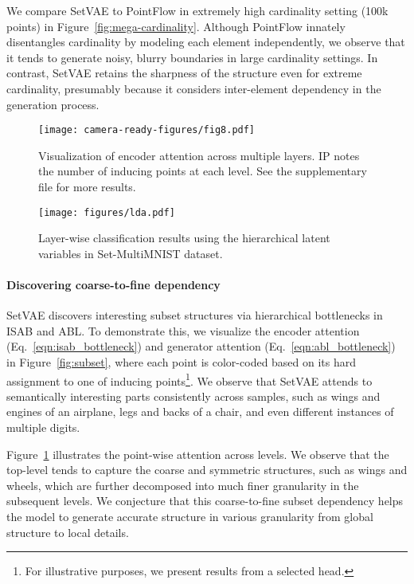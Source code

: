 \documentclass[final]{arxiv/cvpr}
\newcommand{\cutparagraphup}{\vspace*{-0.1in}}
\begin{document}
We compare SetVAE to PointFlow in extremely high cardinality setting (100k points) in Figure~\ref{fig:mega-cardinality}.
Although PointFlow innately disentangles cardinality by modeling each element independently, we observe that it tends to generate noisy, blurry boundaries in large cardinality settings.
In contrast, SetVAE retains the sharpness of the structure even for extreme cardinality, presumably because it considers inter-element dependency in the generation process.

\begin{figure}[!t]
    \centering
    \texttt{[image: camera-ready-figures/fig8.pdf]}
    \vspace{-0.35cm}
    \caption{Visualization of encoder attention across multiple layers.
    IP notes the number of inducing points at each level.
    See the supplementary file for more results.
    }
    \label{fig:composition}
    \vspace{-0.35cm}
\end{figure}
\begin{figure}[!t]
\centering
    \texttt{[image: figures/lda.pdf]}
    \vspace{-0.3cm}
    \caption{
    Layer-wise classification results using the hierarchical latent variables in Set-MultiMNIST dataset.
    }
    \label{fig:lda}
    \vspace{-0.6cm}
\end{figure}

\cutparagraphup
\paragraph{Discovering coarse-to-fine dependency}
SetVAE discovers interesting subset structures via hierarchical bottlenecks in ISAB and ABL.
To demonstrate this, we visualize the encoder attention (Eq.~\eqref{eqn:isab_bottleneck}) and generator attention (Eq.~\eqref{eqn:abl_bottleneck}) in Figure~\ref{fig:subset}, where each point is color-coded based on its hard assignment to one of  inducing points\footnote{For illustrative purposes, we present results from a selected head.}.
We observe that SetVAE attends to semantically interesting parts consistently across samples, such as wings and engines of an airplane, legs and backs of a chair, and even different instances of multiple digits.

Figure~\ref{fig:composition} illustrates the point-wise attention across levels.
We observe that the top-level tends to capture the coarse and symmetric structures, such as wings and wheels, which are further decomposed into much finer granularity in the subsequent levels.
We conjecture that this coarse-to-fine subset dependency helps the model to generate accurate structure in various granularity from global structure to local details.
\end{document}
